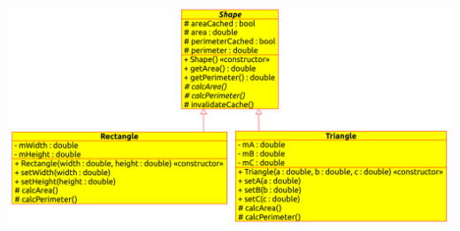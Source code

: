 \documentclass[usenames,dvipsnames,aspectratio=169]{beamer}
\begin{document}
\begin{frame}
    \begin{center}
        \includegraphics[scale=0.6]{Shape15.eps}
      \end{center}
\end{frame}
\end{document}
